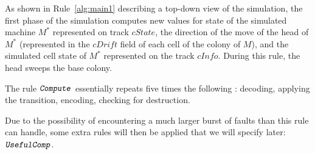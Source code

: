 \documentclass[12pt]{memoir}
\newcommand{\fld}[1]{\ensuremath{\textit{#1}}}
\newcommand{\rul}[1]{\ensuremath{\texttt{\slshape #1\/}}}
\newcommand{\cDrift}{\fld{cDrift}}
\newcommand{\cInfo}{\fld{cInfo}}
\newcommand{\cState}{\fld{cState}}
\newcommand{\Comp}{\rul{Compute}}
\newcommand{\UsefulComp}{\rul{UsefulComp}}
\begin{document}
As shown in Rule~\ref{alg:main1} describing a top-down view of the simulation,
the first phase of the simulation computes new values for state of the 
simulated machine \( M^{*} \)
represented on track \( \cState \), the direction of the move of the head of  \( M^{*} \)
(represented in the \( \cDrift \) field of each cell of the colony of \( M \)), and
the simulated cell state of \( M^{*} \) represented on the track \( \cInfo \).
During this rule, the head sweeps the base colony.

The rule \( \Comp \) essentially repeats five times the following :
decoding, applying the transition, encoding, checking for destruction.

Due to the possibility of encountering a much larger burst of faults than
this rule can handle, some extra rules will then be applied that we will specify later:
\( \UsefulComp \).  %
\end{document}
